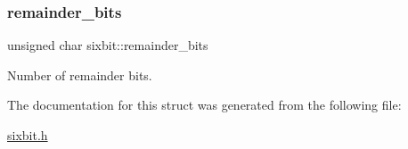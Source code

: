 \subsubsection{\texorpdfstring{remainder\+\_\+bits}{remainder\_bits}}
{\footnotesize\ttfamily unsigned char sixbit\+::remainder\+\_\+bits}



Number of remainder bits. 



The documentation for this struct was generated from the following file\+:\begin{DoxyCompactItemize}
\item 
\mbox{\hyperlink{sixbit_8h}{sixbit.\+h}}\end{DoxyCompactItemize}
